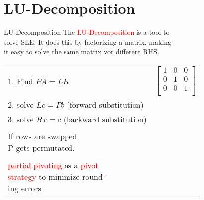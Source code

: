 \section{LU-Decomposition}
\begin{mainbox}{LU-Decomposition}
The \textcolor{red}{LU-Decomposition} is a tool to\\
solve SLE. It does this by factorizing a matrix, making\\
it easy to solve the same matrix vor different RHS.\\
\begin{tabular}{l|l}
	1. Find $PA = LR$ & $\begin{bmatrix}
	1 & 0 & 0 \\
	0 & 1 & 0 \\
	0 & 0 & 1 \\
	\end{bmatrix} $\\
	\makecell[l]{2. solve $Lc = Pb$\\\quad(forward substitution)} & \\
	\makecell[l]{3. solve $Rx = c$\\\quad(backward substitution)} & \\
	& \\
	\makecell[l]{If rows are swapped\\ P gets permutated.} & \\
	& \\
	\makecell[l]{\textcolor{red}{partial pivoting} as a \textcolor{red}{pivot}\\\textcolor{red}{strategy} to minimize round-\\ing errors} & \\
\end{tabular}
\end{mainbox}